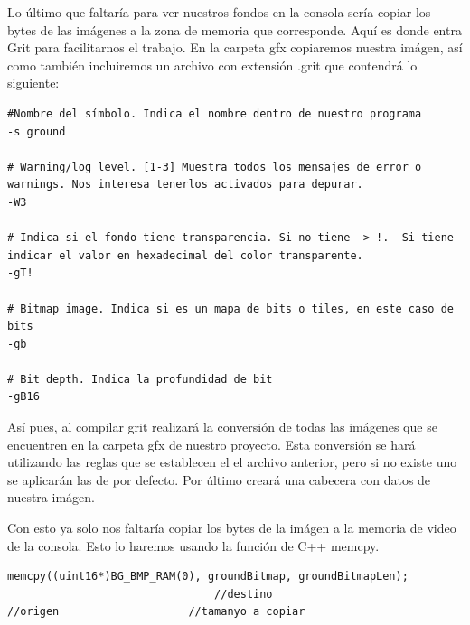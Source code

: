 \vspace{0.5cm}

Lo último que faltaría para ver nuestros fondos en la consola sería copiar los bytes de las imágenes a la zona de memoria que corresponde. Aquí es donde entra Grit para facilitarnos el trabajo. En la carpeta gfx copiaremos nuestra imágen, así como también incluiremos un archivo con extensión .grit que contendrá lo siguiente:

\vspace{0.5cm}

\begin{lstlisting}[caption={Comandos de grit por archivo}, label={code:gritarchive}]
#Nombre del símbolo. Indica el nombre dentro de nuestro programa
-s ground

# Warning/log level. [1-3] Muestra todos los mensajes de error o warnings. Nos interesa tenerlos activados para depurar.
-W3

# Indica si el fondo tiene transparencia. Si no tiene -> !.  Si tiene indicar el valor en hexadecimal del color transparente.
-gT!

# Bitmap image. Indica si es un mapa de bits o tiles, en este caso de bits
-gb

# Bit depth. Indica la profundidad de bit
-gB16
\end{lstlisting}

\vspace{0.5cm}

Así pues, al compilar grit realizará la conversión de todas las imágenes que se encuentren en la carpeta gfx de nuestro proyecto. Esta conversión se hará utilizando las reglas que se establecen el el archivo anterior, pero si no existe uno se aplicarán las de por defecto. Por último creará una cabecera con datos de nuestra imágen.

\vspace{0.5cm}

Con esto ya solo nos faltaría copiar los bytes de la imágen a la memoria de video de la consola. Esto lo haremos usando la función de C++ memcpy.

\vspace{0.5cm}

\begin{lstlisting}[caption={Copia de la imágen en la memoria de video}, label={code:vramcopy}]
memcpy((uint16*)BG_BMP_RAM(0), groundBitmap, groundBitmapLen);
                                //destino                               //origen                    //tamanyo a copiar                                  
\end{lstlisting}

